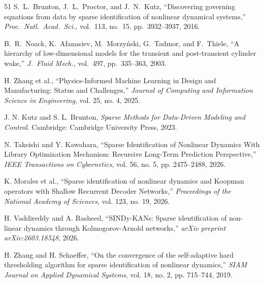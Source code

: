 \documentclass[12pt]{article}
\begin{document}
\begin{thebibliography}{51}
S.~L.\ Brunton, J.~L.\ Proctor, and J.~N.\ Kutz,
``Discovering governing equations from data by sparse identification of
nonlinear dynamical systems,''
\textit{Proc.\ Natl.\ Acad.\ Sci.}, vol.~113, no.~15, pp.~3932--3937, 2016.

B.~R.\ Noack, K.~Afanasiev, M.~Morzy\'{n}ski, G.~Tadmor, and F.~Thiele,
``A hierarchy of low-dimensional models for the transient and post-transient
cylinder wake,''
\textit{J.\ Fluid Mech.}, vol.~497, pp.~335--363, 2003.

H. Zhang et al., ``Physics-Informed Machine Learning in Design and Manufacturing: Status and Challenges,'' \textit{Journal of Computing and Information Science in Engineering}, vol. 25, no. 4, 2025.

J. N. Kutz and S. L. Brunton, \textit{Sparse Methods for Data-Driven Modeling and Control}. Cambridge: Cambridge University Press, 2023.

N. Takeishi and Y. Kawahara, ``Sparse Identification of Nonlinear Dynamics With Library Optimization Mechanism: Recursive Long-Term Prediction Perspective,'' \textit{IEEE Transactions on Cybernetics}, vol. 56, no. 5, pp. 2475--2488, 2026.

K. Morales et al., ``Sparse identification of nonlinear dynamics and Koopman operators with Shallow Recurrent Decoder Networks,'' \textit{Proceedings of the National Academy of Sciences}, vol. 123, no. 19, 2026.

H. Vaddireddy and A. Rasheed, ``SINDy-KANs: Sparse identification of non-linear dynamics through Kolmogorov-Arnold networks,'' \textit{arXiv preprint arXiv:2603.18548}, 2026.

H. Zhang and H. Schaeffer, ``On the convergence of the self-adaptive hard thresholding algorithm for sparse identification of nonlinear dynamics,'' \textit{SIAM Journal on Applied Dynamical Systems}, vol. 18, no. 2, pp. 715--744, 2019.

\end{thebibliography}
\end{document}
